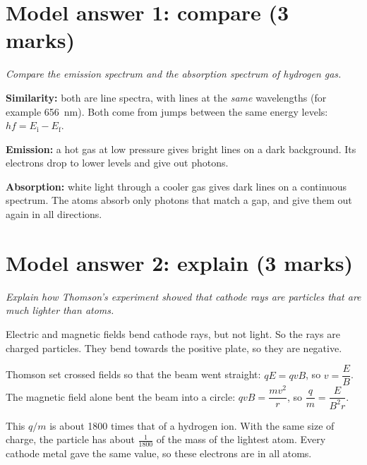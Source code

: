 \section*{Model answer 1: compare (3 marks)}

\emph{Compare the emission spectrum and the absorption spectrum of hydrogen gas.}

\begin{modelanswer}
 \textbf{Similarity:} both are line spectra, with lines at the \emph{same}
wavelengths (for example \qty{656}{nm}). Both come from jumps between the same energy
levels: $hf = E_\mathrm{i} - E_\mathrm{f}$.

 \textbf{Emission:} a hot gas at low pressure gives bright lines on a dark
background. Its electrons drop to lower levels and give out photons.

 \textbf{Absorption:} white light through a cooler gas gives dark lines on a
continuous spectrum. The atoms absorb only photons that match a gap, and give them out
again in all directions.
\end{modelanswer}

\begin{markingcriteria}
\end{markingcriteria}

\section*{Model answer 2: explain (3 marks)}

\emph{Explain how Thomson's experiment showed that cathode rays are particles that are much
lighter than atoms.}

\begin{modelanswer}
 Electric and magnetic fields bend cathode rays, but not light. So the rays are
charged particles. They bend towards the positive plate, so they are negative.

 Thomson set crossed fields so that the beam went straight: $qE = qvB$, so
$v = \dfrac{E}{B}$. The magnetic field alone bent the beam into a circle:
$qvB = \dfrac{mv^2}{r}$, so $\dfrac{q}{m} = \dfrac{E}{B^2 r}$.

 This $q/m$ is about 1800 times that of a hydrogen ion. With the same size
of charge, the particle has about $\tfrac{1}{1800}$ of the mass of the lightest atom. Every
cathode metal gave the same value, so these electrons are in all atoms.
\end{modelanswer}

